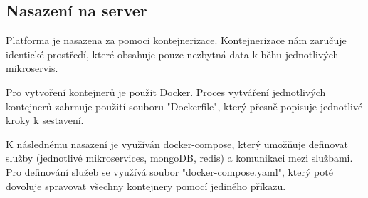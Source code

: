 \subsection{Nasazení na server}
Platforma je nasazena za pomoci kontejnerizace. Kontejnerizace nám zaručuje identické prostředí, které obsahuje pouze nezbytná data k běhu jednotlivých mikroservis.\par
Pro vytvoření kontejnerů je použit Docker. Proces vytváření jednotlivých kontejnerů zahrnuje použití souboru "Dockerfile", který přesně popisuje jednotlivé kroky k sestavení.\par
K následnému nasazení je využíván docker-compose, který umožňuje definovat služby (jednotlivé mikroservices, mongoDB, redis) a komunikaci mezi službami. Pro definování služeb se využívá soubor "docker-compose.yaml", který poté dovoluje spravovat všechny kontejnery pomocí jediného příkazu.
